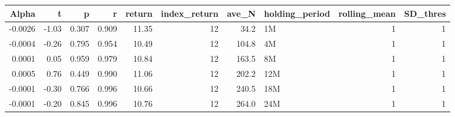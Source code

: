 \begin{table}[ht]
\centering
\begin{tabular}{rrrrrrrlrr}
  \hline
Alpha & t & p & r & return & index\_return & ave\_N & holding\_period & rolling\_mean & SD\_thres \\ 
  \hline
-0.0026 & -1.03 & 0.307 & 0.909 & 11.35 & 12 & 34.2 & 1M &  1 &  1 \\ 
  -0.0004 & -0.26 & 0.795 & 0.954 & 10.49 & 12 & 104.8 & 4M &  1 &  1 \\ 
  0.0001 & 0.05 & 0.959 & 0.979 & 10.84 & 12 & 163.5 & 8M &  1 &  1 \\ 
  0.0005 & 0.76 & 0.449 & 0.990 & 11.06 & 12 & 202.2 & 12M &  1 &  1 \\ 
  -0.0001 & -0.30 & 0.766 & 0.996 & 10.66 & 12 & 240.5 & 18M &  1 &  1 \\ 
  -0.0001 & -0.20 & 0.845 & 0.996 & 10.76 & 12 & 264.0 & 24M &  1 &  1 \\ 
   \hline
\end{tabular}
\end{table}

